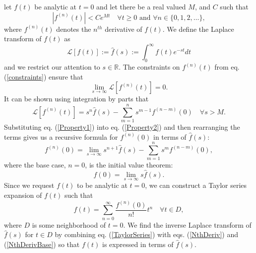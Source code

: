 \documentclass[extra,mreferee]{gji}
\begin{document}
let $f(t)$ be analytic at $t=0$ and let there
  be a real valued $M$, and $C$ such that
\begin{equation}\label{constraints}
  \left|f^{(n)}(t)\right| < Ce^{Mt}\quad \forall t\geq 0\text{ and }\forall n\in\{0,1,2,\dots\},
\end{equation}
where $f^{(n)}(t)$ denotes the $n^{th}$ derivative of $f(t)$.  We
define the Laplace transform of $f(t)$ as
\begin{equation}
  \mathcal{L}[f(t)] := \hat{f}(s) := \int_{0}^\infty f(t)e^{-st}dt
\end{equation}
and we restrict our attention to $s\in\mathbb{R}$.  The constraints on
$f^{(n)}(t)$ from eq. (\ref{constraints}) ensure that
\begin{equation}\label{Property2}
  \lim_{s \to \infty}\mathcal{L}[f^{(n)}(t)] = 0.
\end{equation}
It can be shown using integration by parts that
\begin{equation}\label{Property1}
  \mathcal{L}[f^{(n)}(t)] = s^n\hat{f}(s) - \sum_{m=1}^ns^{m-1}f^{(n-m)}(0)
  \quad \forall s>M.
\end{equation}
Substituting eq. (\ref{Property1}) into eq. (\ref{Property2}) and then
rearranging the terms gives us a recursive formula for $f^{(n)}(0)$ in
terms of $\hat{f}(s)$:
\begin{equation}\label{NthDeriv}
  f^{(n)}(0) = \lim_{s \to \infty} s^{n + 1}\hat{f}(s) -
               \sum_{m=1}^{n} s^{m}f^{(n-m)}(0),
\end{equation}
where the base case, $n=0$, is the initial value theorem:
\begin{equation}\label{NthDerivBase}
  f(0) = \lim_{s \to \infty} s\hat{f}(s).
\end{equation}
Since we request $f(t)$ to be analytic at $t=0$, we can construct a
Taylor series expansion of $f(t)$ such that
\begin{equation}\label{TaylorSeries}
  f(t) = \sum_{n=0}^\infty\frac{f^{(n)}(0)}{n!}t^n \quad \forall {t\in D},
\end{equation}
where $D$ is some neighborhood of $t=0$. We find the inverse Laplace
transform of $\hat{f}(s)$ for $t\in D$ by combining
eq. (\ref{TaylorSeries}) with eqs. (\ref{NthDeriv}) and (\ref{NthDerivBase}) so that $f(t)$ is
expressed in terms of $\hat{f}(s)$.
\end{document}

